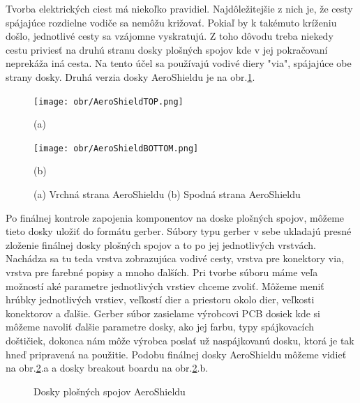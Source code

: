 Tvorba elektrických ciest má niekoľko pravidiel. Najdôležitejšie z nich je, že cesty spájajúce rozdielne vodiče sa nemôžu križovať. Pokiaľ by k takémuto kríženiu došlo, jednotlivé cesty sa vzájomne vyskratujú. Z toho dôvodu treba niekedy cestu priviesť na druhú stranu dosky plošných spojov kde v jej pokračovaní neprekáža iná cesta. Na tento účel sa používajú vodivé diery "via", spájajúce obe strany dosky. Druhá verzia dosky AeroShieldu je na obr.\ref{OBRAZOK 2.4}. 



\begin{figure}[!tbh]
	\centering
	\texttt{[image: obr/AeroShieldTOP.png]}
	
	(a)
	
	\texttt{[image: obr/AeroShieldBOTTOM.png]}
	
	(b)
	
	\caption{(a) Vrchná strana AeroShieldu (b) Spodná strana AeroShieldu}
	\label{OBRAZOK 2.4}
\end{figure}



Po finálnej kontrole zapojenia komponentov na doske plošných spojov, môžeme tieto dosky uložiť do formátu gerber. Súbory typu gerber v sebe ukladajú presné zloženie finálnej dosky plošných spojov a to po jej jednotlivých vrstvách. Nachádza sa tu teda vrstva zobrazujúca vodivé cesty, vrstva pre konektory via, vrstva pre farebné popisy a mnoho ďalších. Pri tvorbe súboru máme veľa možností aké parametre jednotlivých vrstiev chceme zvoliť. Môžeme meniť hrúbky jednotlivých vrstiev, veľkostí dier a priestoru okolo dier, veľkosti konektorov a ďalšie. Gerber súbor zasielame výrobcovi PCB dosiek kde si môžeme navoliť ďalšie parametre dosky, ako jej farbu, typy spájkovacích doštičiek, dokonca nám môže výrobca poslať už naspájkovanú dosku, ktorá je tak hneď pripravená na použitie. Podobu finálnej dosky AeroShieldu môžeme vidieť na obr.\ref{OBRAZOK 2.7}.a a dosky breakout boardu na obr.\ref{OBRAZOK 2.7}.b.


\begin{figure}
	\hfill
	\hfill
	\hfill
	\caption{Dosky plošných spojov AeroShieldu}\label{OBRAZOK 2.7}
\end{figure}

